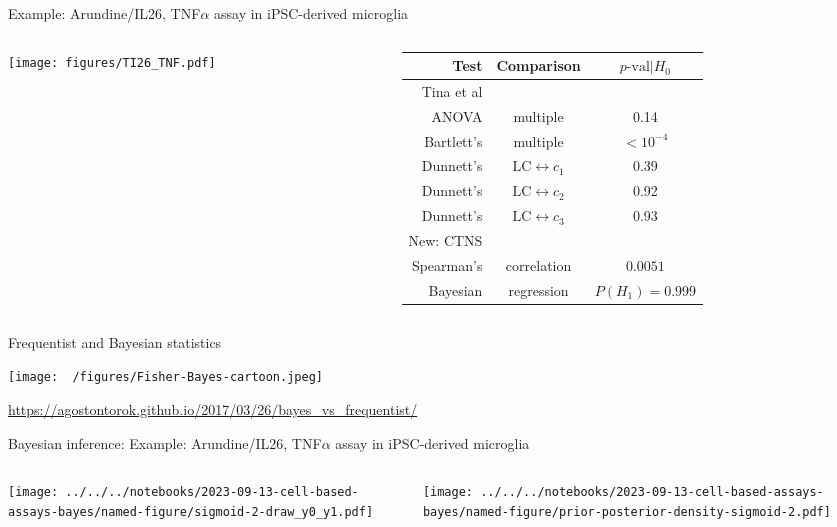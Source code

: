 \documentclass[aspectratio=169]{beamer}
\begin{document}
\begin{frame}{Example: Arundine/IL26, TNF$\alpha$ assay in iPSC-derived microglia }
\begin{columns}[t]
\begin{column}{0.4\textwidth}

\texttt{[image: figures/TI26\_TNF.pdf]}
\end{column}

\begin{column}{0.6\textwidth}

\begin{tabular}{rcc}
  Test & Comparison & $p\text{-val}|H_0$  \\
  \hline
  Tina et al & & \\
  \hline
  ANOVA & multiple & 0.14 \\
  Bartlett's & multiple & $<10^{-4}$ \\
  Dunnett's & $\mathrm{LC} \leftrightarrow c_1$ & 0.39 \\
  Dunnett's & $\mathrm{LC} \leftrightarrow c_2$ & 0.92 \\
  Dunnett's & $\mathrm{LC} \leftrightarrow c_3$ & 0.93 \\
  \hline
  \alert{New: CTNS} & & \\
  \hline
  Spearman's & correlation & $0.0051$ \\
  Bayesian  & regression & $P(H_1) = 0.999$ \\
  \hline
  \end{tabular}
\end{column}
\end{columns}
\end{frame}


\begin{frame}{Frequentist and Bayesian statistics}
\begin{center}
\texttt{[image: ~/figures/Fisher-Bayes-cartoon.jpeg]}

  \tiny{\url{https://agostontorok.github.io/2017/03/26/bayes_vs_frequentist/}}
\end{center}
\end{frame}

\begin{frame}{Bayesian inference: }{Example: Arundine/IL26, TNF$\alpha$ assay in iPSC-derived microglia }
\begin{columns}[b]
\begin{column}{0.45\textwidth}

\texttt{[image: ../../../notebooks/2023-09-13-cell-based-assays-bayes/named-figure/sigmoid-2-draw\_y0\_y1.pdf]}
\end{column}
\begin{column}{0.45\textwidth}

\texttt{[image: ../../../notebooks/2023-09-13-cell-based-assays-bayes/named-figure/prior-posterior-density-sigmoid-2.pdf]}
\end{column}
\end{columns}
\end{frame}
\end{document}
